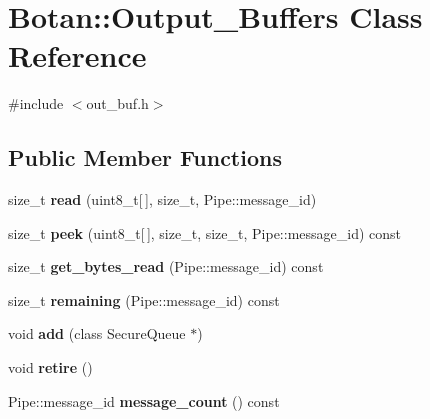 \hypertarget{class_botan_1_1_output___buffers}{}\section{Botan\+:\+:Output\+\_\+\+Buffers Class Reference}
\label{class_botan_1_1_output___buffers}


{\ttfamily \#include $<$out\+\_\+buf.\+h$>$}

\subsection*{Public Member Functions}
\begin{DoxyCompactItemize}
\item 
\mbox{\label{class_botan_1_1_output___buffers_aebe31e1b3ee9076dc6ad118ea8b14382}} 
size\+\_\+t {\bfseries read} (uint8\+\_\+t\mbox{[}$\,$\mbox{]}, size\+\_\+t, Pipe\+::message\+\_\+id)
\item 
\mbox{\label{class_botan_1_1_output___buffers_abc5f95cc871034b0261d5b3c60be549c}} 
size\+\_\+t {\bfseries peek} (uint8\+\_\+t\mbox{[}$\,$\mbox{]}, size\+\_\+t, size\+\_\+t, Pipe\+::message\+\_\+id) const
\item 
\mbox{\label{class_botan_1_1_output___buffers_a8b6dc19c73533ed7d373d1c60c70d6e4}} 
size\+\_\+t {\bfseries get\+\_\+bytes\+\_\+read} (Pipe\+::message\+\_\+id) const
\item 
\mbox{\label{class_botan_1_1_output___buffers_ab9a8910436c7bfe34fe36437e835e1ab}} 
size\+\_\+t {\bfseries remaining} (Pipe\+::message\+\_\+id) const
\item 
\mbox{\label{class_botan_1_1_output___buffers_a9518ee1c272a642dd4bff9c5bef39a31}} 
void {\bfseries add} (class Secure\+Queue $\ast$)
\item 
\mbox{\label{class_botan_1_1_output___buffers_ad596042985f02c23dfb856d938a2d332}} 
void {\bfseries retire} ()
\item 
\mbox{\label{class_botan_1_1_output___buffers_a7cc86d30830f838b6fbbc7884d4f95b6}} 
Pipe\+::message\+\_\+id {\bfseries message\+\_\+count} () const
\end{DoxyCompactItemize}


